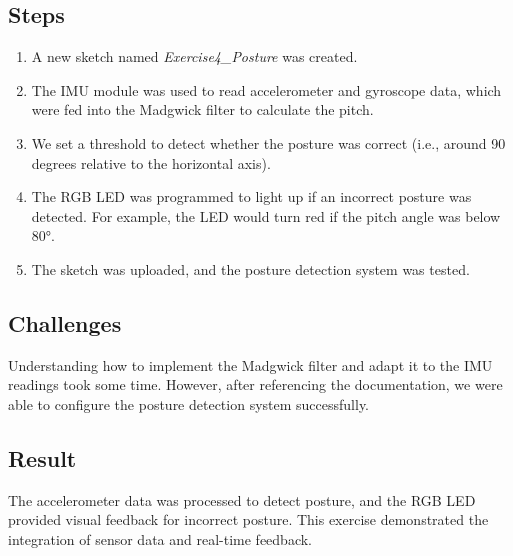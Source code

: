 \documentclass[a4paper,12pt]{article}
\begin{document}
	\subsection{Steps}
	\begin{enumerate}
		\item A new sketch named \textit{Exercise4\_Posture} was created.
		\item The IMU module was used to read accelerometer and gyroscope data, which were fed into the Madgwick filter to calculate the pitch.
		\item We set a threshold to detect whether the posture was correct (i.e., around 90 degrees relative to the horizontal axis).
		\item The RGB LED was programmed to light up if an incorrect posture was detected. For example, the LED would turn red if the pitch angle was below 80°.
		\item The sketch was uploaded, and the posture detection system was tested.
	\end{enumerate}
	
	\subsection{Challenges}
	Understanding how to implement the Madgwick filter and adapt it to the IMU readings took some time. However, after referencing the documentation, we were able to configure the posture detection system successfully.
	
	\subsection{Result}
	The accelerometer data was processed to detect posture, and the RGB LED provided visual feedback for incorrect posture. This exercise demonstrated the integration of sensor data and real-time feedback.
	
\end{document}
